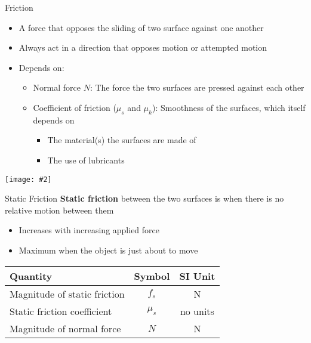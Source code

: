 \documentclass[12pt,compress,aspectratio=169]{beamer}
\newcommand{\pic}[2]{\texttt{[image: \#2]}}
\newcommand{\eq}[2]{\vspace{#1}{\Large\begin{displaymath}#2\end{displaymath}}}
\begin{document}
\begin{frame}{Friction}
  \begin{itemize}
  \item A force that opposes the sliding of two surface against one another
  \item Always act in a direction that opposes motion or attempted motion
  \item Depends on:
    \begin{itemize}
    \item Normal force $N$: The force the two surfaces are pressed against
      each other
    \item Coefficient of friction ($\mu_s$ and $\mu_k$): Smoothness of the
      surfaces, which itself depends on
      \begin{itemize}
      \item The material(s) the surfaces are made of
      \item The use of lubricants
      \end{itemize}
    \end{itemize}
  \end{itemize}
  \begin{center}
    \vspace{-.1in}
    \pic{.5}{graphics/friction.png}
  \end{center}
\end{frame}



\begin{frame}{Static Friction}
  \textbf{Static friction} between the two surfaces is when there is no
  relative motion between them
  \begin{itemize}
  \item Increases with increasing applied force
  \item Maximum when the object is just about to move
  \end{itemize}

  \eq{-.35in}{
    \boxed{f_s\leq\mu_sN}
  }
  \begin{center}
    \begin{tabular}{l|c|c}
      \rowcolor{pink}
      \textbf{Quantity} & \textbf{Symbol} & \textbf{SI Unit} \\ \hline
      Magnitude of static friction & $f_s$ & \si{\newton} \\
      Static friction coefficient  & $\mu_s$ & no units \\
      Magnitude of normal force    & $N$ & \si{\newton}
    \end{tabular}
  \end{center}
\end{frame}
\end{document}
